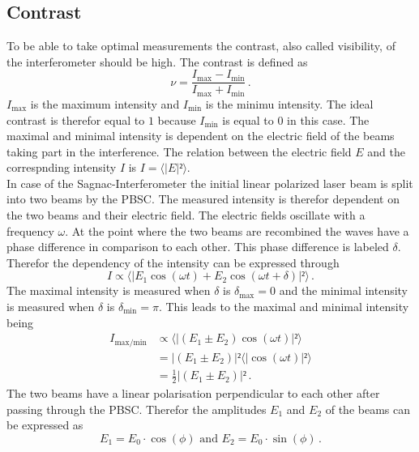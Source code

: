   \subsection{Contrast}
  To be able to take optimal measurements the contrast, also called visibility, of the interferometer should be high. The contrast is defined
   as 
  \begin{equation}
    \nu = \frac{I_{\text{max}}- I_{\text{min}}}{I_{\text{max}}+ I_{\text{min}}}\, .
    \label{eqn:contrast}
  \end{equation}
 $I_{\text{max}}$ is the maximum intensity and $I_{\text{min}}$ is the minimu intensity. The ideal contrast is therefor equal to $1$ because
 $I_{\text{min}}$ is equal to $0$ in this case. The maximal and minimal intensity is dependent on the electric field of the beams taking 
 part in the interference. The relation between the electric field $E$ and the correspnding intensity $I$ is $I = \langle |E|² \rangle$. \\
 In case of the Sagnac-Interferometer the initial linear polarized laser beam is split into two beams by the PBSC. The measured 
 intensity is therefor dependent on the two beams and their electric field. The electric fields oscillate with a frequency $\omega$. 
 At the point where the two beams are recombined the waves have a phase difference in comparison to each other. This phase difference
 is labeled $\delta$. Therefor the dependency of the intensity can be expressed through
 \begin{equation*}
    I \propto \langle |E_1 \cos(\omega t) + E_2 \cos(\omega t + \delta)|²\rangle \, .
 \end{equation*}
 The maximal intensity is measured when $\delta$ is $\delta_{\text{max}} = 0$ and the minimal intensity is
 measured when $\delta$ is $\delta_{\text{min}} = \pi$. 
 This leads to the maximal and minimal intensity being 
 \begin{align*}
    I_{\text{max/min}} &\propto \langle |(E_1 \pm E_2) \cos(\omega t)|²\rangle \\
    &= |(E_1 \pm E_2)|² \langle |\cos(\omega t)|²\rangle \\
    &= \frac{1}{2} |(E_1 \pm E_2)|² \, .
 \end{align*}
 The two beams have a linear polarisation perpendicular to each other after passing through the PBSC. 
 Therefor the amplitudes $E_1$ and $E_2$ of the beams can be expressed as 
 \begin{equation}
    E_1 = E_0 \cdot \cos(\phi) \,\, \text{and} \,\, E_2 = E_0 \cdot \sin(\phi) \, .
    \label{eqn:E_Felder}
 \end{equation}
